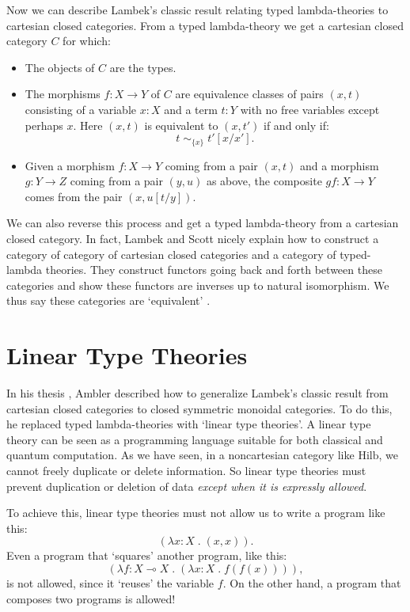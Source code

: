 \documentclass[12pt,twoside,openright]{report}
\newcommand{\Hilb}{\mathrm{Hilb}}
\newcommand{\maps}{\colon}
\newcommand{\lhom}{\multimap}
\begin{document}
Now we can describe Lambek's classic result relating typed lambda-theories to cartesian closed categories.  From a typed lambda-theory we get a cartesian closed category $C$ for which:
\begin{itemize}
\item The objects of $C$ are the types.
\item The morphisms $f \maps X \to Y$ of $C$
are equivalence classes of pairs
$(x,t)$ consisting of a variable $x\!:\!X$ and a term $t\!:\!Y$ with no free variables except perhaps $x$.  Here $(x,t)$ is equivalent to $(x,t')$ if and only if:
\[     t \; \sim_{\{x\}} \; t'[x/x'] . \]
\item Given a morphism $f \maps X \to Y$
coming from a pair $(x,t)$ and a morphism $g \maps Y \to Z$
coming from a pair $(y,u)$ as above, the composite 
$gf \maps X \to Y$ comes from the pair $(x,u[t/y])$.
\end{itemize}
We can also reverse this process and get a typed lambda-theory from a cartesian closed category.  In fact, Lambek and Scott nicely explain how to construct a category of category of cartesian closed categories and a category of typed-lambda theories.  They construct functors going back and forth between these categories and show these functors are inverses up to natural isomorphism.  We thus say these categories are `equivalent' \cite{LS}.

\section{Linear Type Theories}
\label{linear_type_theories}

In his thesis \cite{Ambler}, Ambler described how to generalize Lambek's classic result from cartesian closed categories to closed symmetric monoidal categories.  To do this, he replaced typed lambda-theories with `linear type theories'.  A linear type theory can be seen as a programming language suitable for both classical and quantum computation.  As we have seen, in a noncartesian category like
$\Hilb$, we cannot freely duplicate or delete information.  So linear type theories must prevent duplication or deletion of data {\it except when it is expressly allowed}.

To achieve this, linear type theories must not allow us to write a program like this:
\[    (\lambda x\!:\!X \; . \; (x,x)) .      \]
Even a program that `squares' another program, like this:
\[   
 (\lambda f\!:\!X \lhom X \;.\;(\lambda \!x:\!X \; . \; f(f(x)))), \]
is not allowed, since it `reuses' the variable $f$.  On the other hand, a program that composes two programs is allowed!
\end{document}
